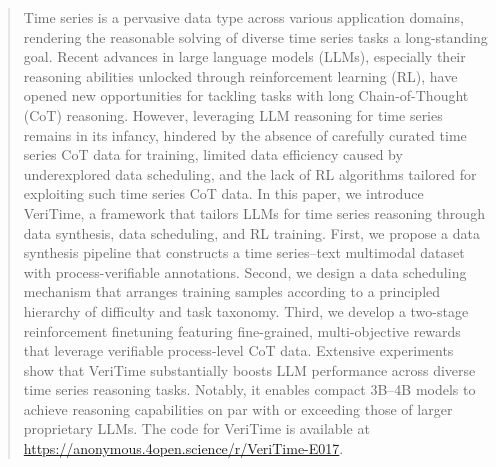 \documentclass{article}
\theoremstyle{plain}
\theoremstyle{definition}
\theoremstyle{remark}
\begin{document}




\printAffiliationsAndNotice{}  

\begin{abstract}
Time series is a pervasive data type across various application domains, rendering the reasonable solving of diverse time series tasks a long-standing goal. Recent advances in large language models (LLMs), especially their reasoning abilities unlocked through reinforcement learning (RL), have opened new opportunities for tackling tasks with long Chain-of-Thought (CoT) reasoning. However, leveraging LLM reasoning for time series remains in its infancy, hindered by the absence of carefully curated time series CoT data for training, limited data efficiency caused by underexplored data scheduling, and the lack of RL algorithms tailored for exploiting such time series CoT data. In this paper, we introduce VeriTime, a framework that tailors LLMs for time series reasoning through data synthesis, data scheduling, and RL training. First, we propose a data synthesis pipeline that constructs a time series–text multimodal dataset with process-verifiable annotations. Second, we design a data scheduling mechanism that arranges training samples according to a principled hierarchy of difficulty and task taxonomy. Third, we develop a two-stage reinforcement finetuning featuring fine-grained, multi-objective rewards that leverage verifiable process-level CoT data. Extensive experiments show that VeriTime substantially boosts LLM performance across diverse time series reasoning tasks. Notably, it enables compact 3B–4B models to achieve reasoning capabilities on par with or exceeding those of larger proprietary LLMs. The code for VeriTime is available at \url{https://anonymous.4open.science/r/VeriTime-E017}.
\end{abstract}
\end{document}

